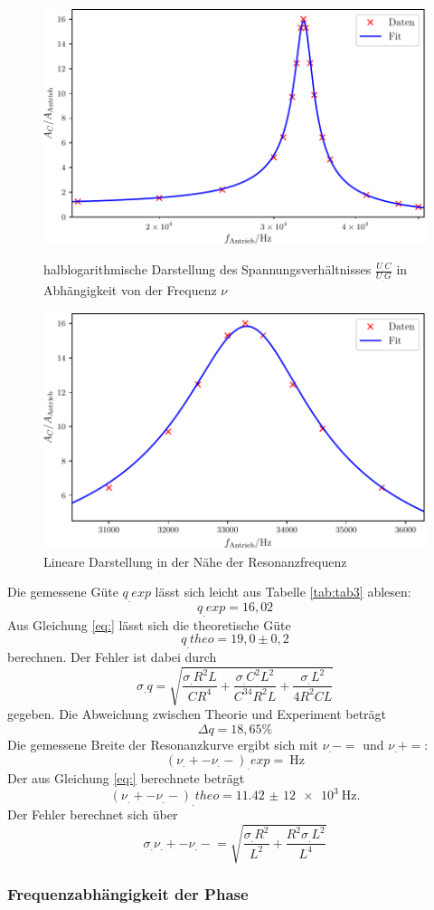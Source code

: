 \begin{figure}
\centering
\includegraphics[scale=0.6]{content/images/Graphc1.pdf}
\caption{halblogarithmische Darstellung des Spannungsverhältnisses $\frac{U_.C}{U_.G}$ in Abhängigkeit von der Frequenz $\nu$}\label{fig:fig2}
\includegraphics[scale=0.6]{content/images/Graphc2.pdf}
\caption{Lineare Darstellung in der Nähe der Resonanzfrequenz}
\label{fig:fig3}
\end{figure}
\newpage
\noindent
Die gemessene Güte $q_.{exp}$ lässt sich leicht aus Tabelle \ref{tab:tab3} ablesen:
\[
q_.{exp}=16,02
\]
Aus Gleichung \eqref{eq:} lässt sich die theoretische Güte 
\[
q_.{theo}=19,0\pm 0,2
\] berechnen.
Der Fehler ist dabei durch 
\[
\sigma_.q=\sqrt{\frac{\sigma_.R^2L}{CR^4}+\frac{\sigma_.C^2L^2}{C^34R^2L}+\frac{\sigma_.L^2}{4R^2CL}}
\]
gegeben.
Die Abweichung zwischen Theorie und Experiment beträgt
\[
\Delta q = 18,65\%
\]
Die gemessene Breite der Resonanzkurve ergibt sich mit $\nu_.-=$ und $\nu_.+=$:
\[
(\nu_.+-\nu_.-)_.{exp}=\SI{}{\hertz}
\]
Der aus Gleichung \eqref{eq:} berechnete beträgt
\[
(\nu_.+-\nu_.-)_.{theo}=\SI{11,42(12)e3}{\hertz}\text{.}
\]
Der Fehler berechnet sich über
\[
\sigma_.{\nu_.+-\nu_.-}=\sqrt{\frac{\sigma_.R^2}{L^2}+\frac{R^2\sigma_.L^2}{L^4}}
\]
\subsubsection{Frequenzabhängigkeit der Phase}
